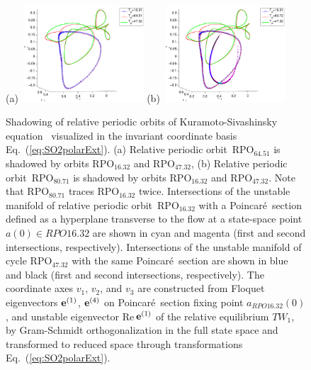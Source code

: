 \documentclass[aip,cha,showpacs,reprint]{revtex4-1} %
\newcommand{\refref} [1] {Ref.~\onlinecite{#1}}
\newcommand{\refeq}  [1] {Eq.~(\ref{#1})}                   %
\newcommand{\KSe}{Kuramoto-Siva\-shin\-sky equation}
\newcommand{\Poincare}{Poincar\'e}
\newcommand{\jEigvec}[1][]{\ensuremath{{\bf e}^{(#1)}}} %
\newcommand{\rpo}{rela\-ti\-ve periodic orbit}
\newcommand{\Rpo}{Rela\-ti\-ve periodic orbit}
\newcommand{\REQV}[2]{\ensuremath{TW_{#1#2}}} %
\newcommand{\RPO}[1]{\ensuremath{\mathrm{RPO}_{#1}}}
\newcommand{\ssp}{a}            %
\begin{document}
\begin{figure}
 (a)~\includegraphics[width=0.40\textwidth]{ks22rpoT6451shad}
 (b)~\includegraphics[width=0.40\textwidth]{ks22rpoT8072shad_manif}
\caption{\label{f:rpo_shad}
 Shadowing of \rpo s of \KSe\
visualized in the invariant coordinate basis \refeq{eq:SO2polarExt}.
(a) \Rpo\ $\RPO{64.51}$ is shadowed by orbits $\RPO{16.32}$ and
$\RPO{47.32}$, (b) \Rpo\ $\RPO{80.71}$ is shadowed by orbits
$\RPO{16.32}$ and $\RPO{47.32}$. Note that $\RPO{80.71}$ traces
$\RPO{16.32}$ twice. Intersections of the unstable manifold of \rpo\
$\RPO{16.32}$ with a \Poincare\ section defined as a hyperplane
transverse to the flow at a state-space point $\ssp(0) \in RPO{16.32}$ are
shown in cyan and magenta (first and second intersections, respectively).
Intersections of the unstable manifold of cycle $\RPO{47.32}$ with the
same \Poincare\ section are shown in blue and black (first and second
intersections, respectively). The coordinate axes $v_1$, $v_2$, and $v_3$
are constructed from Floquet eigenvectors $\jEigvec[1]$, $\jEigvec[4]$ on
\Poincare\ section fixing point $\ssp_{RPO{16.32}}(0)$, and unstable
eigenvector {Re\,}$\jEigvec[1]$ of the relative equilibrium
\REQV{}{1}, by Gram-Schmidt orthogonalization in the full state space and
transformed to reduced space through transformations
\refeq{eq:SO2polarExt}.
}
\end{figure}
\end{document}
